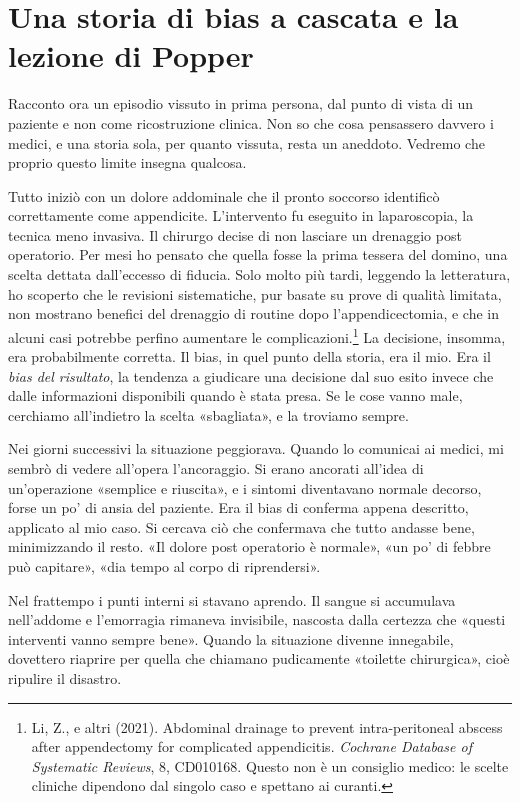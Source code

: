 \section{Una storia di bias a cascata e la lezione di Popper}

Racconto ora un episodio vissuto in prima persona, dal punto di vista di un paziente e non come ricostruzione clinica. Non so che cosa pensassero davvero i medici, e una storia sola, per quanto vissuta, resta un aneddoto. Vedremo che proprio questo limite insegna qualcosa.

Tutto inizi\`{o} con un dolore addominale che il pronto soccorso identific\`{o} correttamente come appendicite. L'intervento fu eseguito in laparoscopia, la tecnica meno invasiva. Il chirurgo decise di non lasciare un drenaggio post operatorio. Per mesi ho pensato che quella fosse la prima tessera del domino, una scelta dettata dall'eccesso di fiducia. Solo molto pi\`{u} tardi, leggendo la letteratura, ho scoperto che le revisioni sistematiche, pur basate su prove di qualit\`{a} limitata, non mostrano benefici del drenaggio di routine dopo l'appendicectomia, e che in alcuni casi potrebbe perfino aumentare le complicazioni.\footnote{Li, Z., e altri (2021). Abdominal drainage to prevent intra-peritoneal abscess after appendectomy for complicated appendicitis. \textit{Cochrane Database of Systematic Reviews}, 8, CD010168. Questo non è un consiglio medico: le scelte cliniche dipendono dal singolo caso e spettano ai curanti.} La decisione, insomma, era probabilmente corretta. Il bias, in quel punto della storia, era il mio. Era il \textit{bias del risultato}, la tendenza a giudicare una decisione dal suo esito invece che dalle informazioni disponibili quando \`{e} stata presa. Se le cose vanno male, cerchiamo all'indietro la scelta «sbagliata», e la troviamo sempre.

Nei giorni successivi la situazione peggiorava. Quando lo comunicai ai medici, mi sembr\`{o} di vedere all'opera l'ancoraggio. Si erano ancorati all'idea di un'operazione «semplice e riuscita», e i sintomi diventavano normale decorso, forse un po' di ansia del paziente. Era il bias di conferma appena descritto, applicato al mio caso. Si cercava ci\`{o} che confermava che tutto andasse bene, minimizzando il resto. «Il dolore post operatorio \`{e} normale», «un po' di febbre pu\`{o} capitare», «dia tempo al corpo di riprendersi».

Nel frattempo i punti interni si stavano aprendo. Il sangue si accumulava nell'addome e l'emorragia rimaneva invisibile, nascosta dalla certezza che «questi interventi vanno sempre bene». Quando la situazione divenne innegabile, dovettero riaprire per quella che chiamano pudicamente «toilette chirurgica», cio\`{e} ripulire il disastro.

